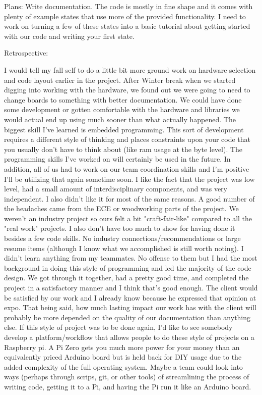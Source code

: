 \documentclass[onecolumn, draftclsnofoot,10pt, compsoc]{IEEEtran}
\begin{document}
Plans: Write documentation. The code is mostly in fine shape and it comes with plenty of example states that use more of the provided functionality. I need to work on turning a few of these states into a basic tutorial about getting started with our code and writing your first state.

Retrospective:

I would tell my fall self to do a little bit more ground work on hardware selection and code layout earlier in the project. After Winter break when we started digging into working with the hardware, we found out we were going to need to change boards to something with better documentation. We could have done some development or gotten comfortable with the hardware and libraries we would actual end up using much sooner than what actually happened.
The biggest skill I've learned is embedded programming. This sort of development requires a different style of thinking and places constraints upon your code that you usually don't have to think about (like ram usage at the byte level).
The programming skills I've worked on will certainly be used in the future. In addition, all of us had to work on our team coordination skills and I'm positive I'll be utilizing that again sometime soon.
I like the fact that the project was low level, had a small amount of interdisciplinary components, and was very independent. I also didn't like it for most of the same reasons. A good number of the headaches came from the ECE or woodworking parts of the project. We weren't an industry project so ours felt a bit "craft-fair-like" compared to all the "real work" projects. I also don't have too much to show for having done it besides a few code skills. No industry connections/recommendations or large resume items (although I know what we accomplished is still worth noting).
I didn't learn anything from my teammates. No offense to them but I had the most background in doing this style of programming and led the majority of the code design. We got through it together, had a pretty good time, and completed the project in a satisfactory manner and I think that's good enough.
The client would be satisfied by our work and I already know because he expressed that opinion at expo. That being said, how much lasting impact our work has with the client will probably be more depended on the quality of our documentation than anything else.
If this style of project was to be done again, I'd like to see somebody develop a platform/workflow that allows people to do these style of projects on a Raspberry pi. A Pi Zero gets you much more power for your money than an equivalently priced Arduino board but is held back for DIY usage due to the added complexity of the full operating system. Maybe a team could look into ways (perhaps through scrips, git, or other tools) of streamlining the process of writing code, getting it to a Pi, and having the Pi run it like an Arduino board.
\end{document}
